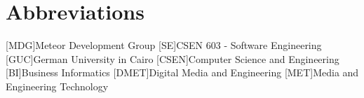 \appendix
\renewcommand{\appendixtocname}{Appendix}
\renewcommand{\appendixpagename}{\appendixtocname}
\addappheadtotoc
{}
\appendixpage

\chapter{Abbreviations}

\begin{acronym}[\hspace{3cm}]
  [MDG]{Meteor Development Group}
  [SE]{CSEN 603 - Software Engineering}
  [GUC]{German University in Cairo}
  [CSEN]{Computer Science and Engineering}
  [BI]{Business Informatics}
  [DMET]{Digital Media and Engineering}
  [MET]{Media and Engineering Technology}
\end{acronym}

\clearpage
\listoffigures
{}

